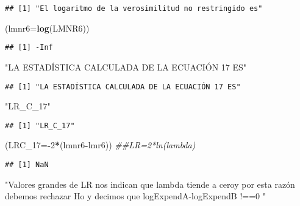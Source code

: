 \documentclass[
]{article}
\newenvironment{Shaded}{\begin{snugshade}}{\end{snugshade}}
\newcommand{\CommentTok}[1]{\textcolor[rgb]{0.56,0.35,0.01}{\textit{#1}}}
\newcommand{\DataTypeTok}[1]{\textcolor[rgb]{0.13,0.29,0.53}{#1}}
\newcommand{\DecValTok}[1]{\textcolor[rgb]{0.00,0.00,0.81}{#1}}
\newcommand{\KeywordTok}[1]{\textcolor[rgb]{0.13,0.29,0.53}{\textbf{#1}}}
\newcommand{\NormalTok}[1]{#1}
\newcommand{\OperatorTok}[1]{\textcolor[rgb]{0.81,0.36,0.00}{\textbf{#1}}}
\newcommand{\StringTok}[1]{\textcolor[rgb]{0.31,0.60,0.02}{#1}}
\begin{document}
\begin{verbatim}
## [1] "El logaritmo de la verosimilitud no restringido es"
\end{verbatim}

\begin{Shaded}
\begin{Highlighting}[]
\NormalTok{(}\DataTypeTok{lmnr6=}\KeywordTok{log}\NormalTok{(LMNR6))}
\end{Highlighting}
\end{Shaded}

\begin{verbatim}
## [1] -Inf
\end{verbatim}

\begin{Shaded}
\begin{Highlighting}[]
\StringTok{"LA ESTADÍSTICA CALCULADA DE LA ECUACIÓN 17 ES"}
\end{Highlighting}
\end{Shaded}

\begin{verbatim}
## [1] "LA ESTADÍSTICA CALCULADA DE LA ECUACIÓN 17 ES"
\end{verbatim}

\begin{Shaded}
\begin{Highlighting}[]
\StringTok{"LR_C_17"}
\end{Highlighting}
\end{Shaded}

\begin{verbatim}
## [1] "LR_C_17"
\end{verbatim}

\begin{Shaded}
\begin{Highlighting}[]
\NormalTok{(}\DataTypeTok{LRC_17=}\OperatorTok{-}\DecValTok{2}\OperatorTok{*}\NormalTok{(lmnr6}\OperatorTok{-}\NormalTok{lmr6)) }\CommentTok{##LR=2*ln(lambda)}
\end{Highlighting}
\end{Shaded}

\begin{verbatim}
## [1] NaN
\end{verbatim}

\begin{Shaded}
\begin{Highlighting}[]
\StringTok{"Valores grandes de LR nos indican que lambda tiende a ceroy por esta razón debemos rechazar Ho y decimos que logExpendA-logExpendB !==0 "}
\end{Highlighting}
\end{Shaded}
\end{document}
